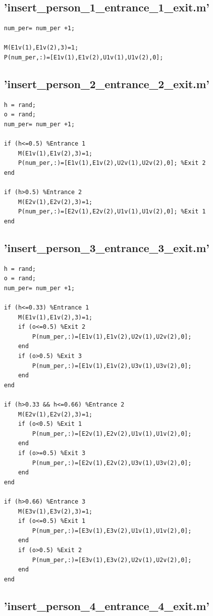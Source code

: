 \documentclass[11pt]{article}
\begin{document}
\subsection{'insert\_person\_1\_entrance\_1\_exit.m'}

\begin{lstlisting}
num_per= num_per +1;

M(E1v(1),E1v(2),3)=1;
P(num_per,:)=[E1v(1),E1v(2),U1v(1),U1v(2),0];
\end{lstlisting}

\subsection {'insert\_person\_2\_entrance\_2\_exit.m'}

\begin{lstlisting}
h = rand;
o = rand;
num_per= num_per +1;

if (h<=0.5) %Entrance 1
    M(E1v(1),E1v(2),3)=1;
    P(num_per,:)=[E1v(1),E1v(2),U2v(1),U2v(2),0]; %Exit 2
end

if (h>0.5) %Entrance 2
    M(E2v(1),E2v(2),3)=1;
    P(num_per,:)=[E2v(1),E2v(2),U1v(1),U1v(2),0]; %Exit 1
end
\end{lstlisting}

\subsection {'insert\_person\_3\_entrance\_3\_exit.m'}

\begin{lstlisting}
h = rand;
o = rand;
num_per= num_per +1;

if (h<=0.33) %Entrance 1
    M(E1v(1),E1v(2),3)=1;
    if (o<=0.5) %Exit 2
        P(num_per,:)=[E1v(1),E1v(2),U2v(1),U2v(2),0];
    end
    if (o>0.5) %Exit 3
        P(num_per,:)=[E1v(1),E1v(2),U3v(1),U3v(2),0];
    end
end

if (h>0.33 && h<=0.66) %Entrance 2
    M(E2v(1),E2v(2),3)=1;
    if (o<0.5) %Exit 1
        P(num_per,:)=[E2v(1),E2v(2),U1v(1),U1v(2),0];
    end
    if (o>=0.5) %Exit 3
        P(num_per,:)=[E2v(1),E2v(2),U3v(1),U3v(2),0];
    end
end

if (h>0.66) %Entrance 3
    M(E3v(1),E3v(2),3)=1;
    if (o<=0.5) %Exit 1
        P(num_per,:)=[E3v(1),E3v(2),U1v(1),U1v(2),0];
    end
    if (o>0.5) %Exit 2
        P(num_per,:)=[E3v(1),E3v(2),U2v(1),U2v(2),0];
    end
end
\end{lstlisting}

\subsection {'insert\_person\_4\_entrance\_4\_exit.m'}
\end{document}
